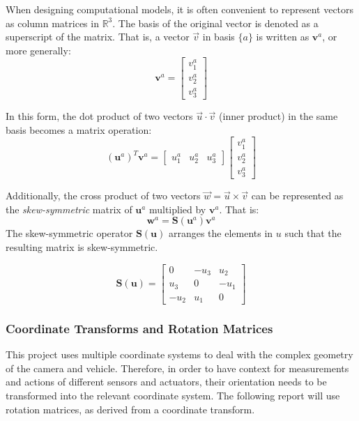 \documentclass{UoNMCHA}
\numberwithin{equation}{section}
\begin{document}
When designing computational models, it is often convenient to represent vectors as column matrices in $\mathbb{R}^3$. The basis of the original vector is denoted as a superscript of the matrix. That is, a vector $\vec{v}$ in basis $\{a\}$ is written as $\mathbf{v}^a$, or more generally: 
\begin{equation}
	\mathbf{v}^a = 
	\begin{bmatrix}
		v^{a}_1\\
		v^{a}_2\\
		v^{a}_3
	\end{bmatrix}
\end{equation}

In this form, the dot product of two vectors $\vec{u} \cdot \vec{v}$ (inner product) in the same basis becomes a matrix operation:
\begin{equation}
	(\mathbf{u}^{a})^{T}\mathbf{v}^{a} = 
	\begin{bmatrix}
		u^{a}_1 & u^{a}_2 & u^{a}_3
	\end{bmatrix}
	\begin{bmatrix}
		v^{a}_1\\
		v^{a}_2\\
		v^{a}_3
	\end{bmatrix}
\end{equation}

Additionally, the cross product of two vectors $\vec{w} = \vec{u}\times\vec{v}$ can be represented as the \textit{skew-symmetric} matrix of $\mathbf{u}^{a}$ multiplied by $\mathbf{v}^{a}$. That is:
\begin{equation}
	\mathbf{w}^{a} = \mathbf{S}(\mathbf{u}^a)\mathbf{v}^a
\end{equation}
The skew-symmetric operator $\mathbf{S(u)}$ arranges the elements in $u$ such that the resulting matrix is skew-symmetric.

\begin{equation}\label{eq:SkewSymmetric}
	\mathbf{S}(\mathbf{u}) = 
	\begin{bmatrix}
		0 & -u_{3} & u_{2}\\
		u_{3} & 0 & -u_{1}\\
		-u_{2} & u_{1} & 0
	\end{bmatrix}
\end{equation}

\subsubsection{Coordinate Transforms and Rotation Matrices}
This project uses multiple coordinate systems to deal with the complex geometry of the camera and vehicle. Therefore, in order to have context for measurements and actions of different sensors and actuators, their orientation needs to be transformed into the relevant coordinate system. The following report will use rotation matrices, as derived from a coordinate transform.
\end{document}
